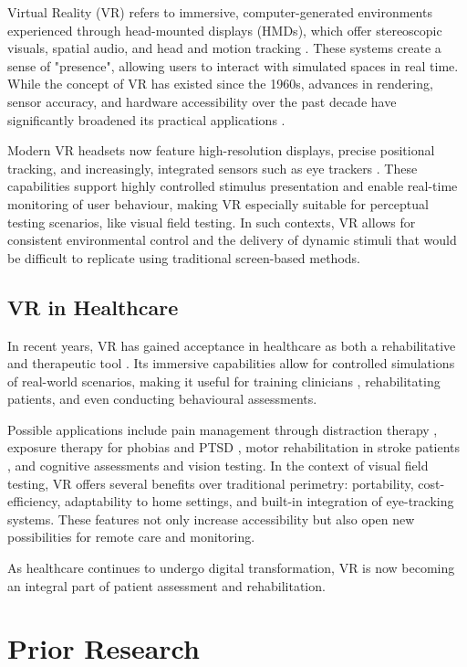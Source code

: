 \documentclass{l4proj}
\begin{document}
Virtual Reality (VR) refers to immersive, computer-generated environments experienced through head-mounted displays (HMDs), which offer stereoscopic visuals, spatial audio, and head and motion tracking \citep{vr1}. These systems create a sense of "presence", allowing users to interact with simulated spaces in real time. While the concept of VR has existed since the 1960s, advances in rendering, sensor accuracy, and hardware accessibility over the past decade have significantly broadened its practical applications \citep{vr1}.

Modern VR headsets now feature high-resolution displays, precise positional tracking, and increasingly, integrated sensors such as eye trackers \citep{vr1}. These capabilities support highly controlled stimulus presentation and enable real-time monitoring of user behaviour, making VR especially suitable for perceptual testing scenarios, like visual field testing. In such contexts, VR allows for consistent environmental control and the delivery of dynamic stimuli that would be difficult to replicate using traditional screen-based methods.


\subsection{VR in Healthcare}

In recent years, VR has gained acceptance in healthcare as both a rehabilitative and therapeutic tool \citep{vr2}. Its immersive capabilities allow for controlled simulations of real-world scenarios, making it useful for training clinicians \citep{vr6}, rehabilitating patients, and even conducting behavioural assessments. 

Possible applications include pain management through distraction therapy \citep{vr5}, exposure therapy for phobias and PTSD \citep{vr3}, motor rehabilitation in stroke patients \citep{vr4}, and cognitive assessments and vision testing. In the context of visual field testing, VR offers several benefits over traditional perimetry: portability, cost-efficiency, adaptability to home settings, and built-in integration of eye-tracking systems. These features not only increase accessibility but also open new possibilities for remote care and monitoring.

As healthcare continues to undergo digital transformation, VR is now becoming an integral part of patient assessment and rehabilitation.


\section{Prior Research}
\end{document}
